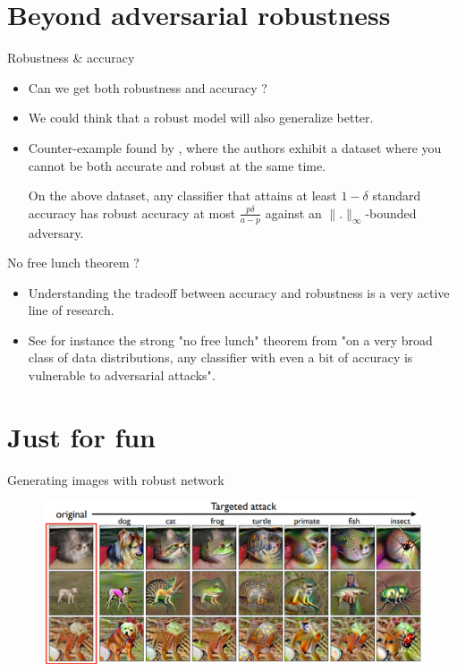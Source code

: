 \documentclass{beamer}
\begin{document}
\section{Beyond adversarial robustness}
\begin{frame}{Robustness \& accuracy}
    \begin{itemize}
        \item Can we get both robustness and accuracy ?
        \item We could think that a robust model will also generalize better. 
        \item Counter-example found by \cite{tsipras2018robustness}, where the authors exhibit a dataset where you cannot be both accurate and robust at the same time.
        \begin{theorem}
            On the above dataset, any classifier that attains at least $1-\delta$ standard accuracy has robust accuracy at most $\frac{p\delta}{a-p}$ against an $\|.\|_\infty$-bounded adversary.
        \end{theorem}
        
    \end{itemize}
\end{frame}

\begin{frame}{No free lunch theorem ?}

\begin{itemize}
    \item Understanding the tradeoff between accuracy and
robustness is a very active line of research. 
    \item See for instance the strong "no free lunch" theorem from \cite{dohmatob2018limitations} "on a very broad class of data distributions, any classifier with even a bit of accuracy is vulnerable to adversarial attacks".
\end{itemize}
\end{frame}

\section{Just for fun}
\begin{frame}{Generating images with robust network}
    \begin{figure}
    \includegraphics[width=1.\textwidth]{images/robust_classifier_targeted_attack.PNG}
    \caption{\cite{santurkar2019image}}
    \end{figure}
\end{frame}
\end{document}
